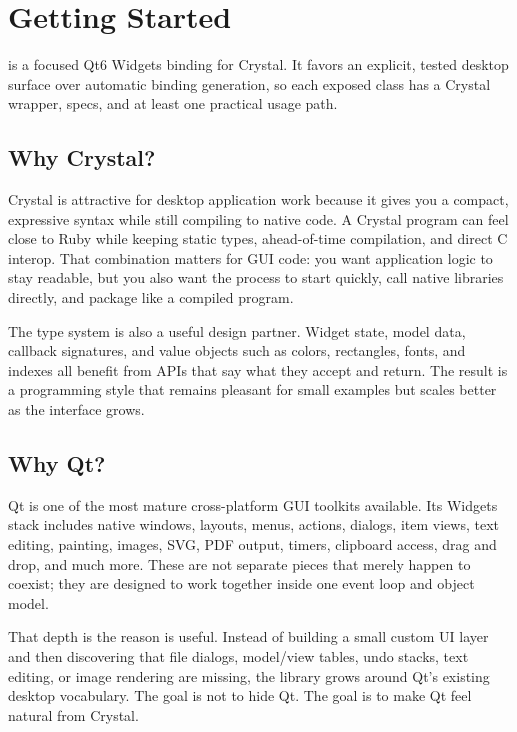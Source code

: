 \chapter{Getting Started}

 is a focused Qt6 Widgets binding for Crystal. It favors an explicit, tested desktop surface over automatic binding generation, so each exposed class has a Crystal wrapper, specs, and at least one practical usage path.

\section{Why Crystal?}

Crystal is attractive for desktop application work because it gives you a compact, expressive syntax while still compiling to native code. A Crystal program can feel close to Ruby while keeping static types, ahead-of-time compilation, and direct C interop. That combination matters for GUI code: you want application logic to stay readable, but you also want the process to start quickly, call native libraries directly, and package like a compiled program.

The type system is also a useful design partner. Widget state, model data, callback signatures, and value objects such as colors, rectangles, fonts, and indexes all benefit from APIs that say what they accept and return. The result is a programming style that remains pleasant for small examples but scales better as the interface grows.

\section{Why Qt?}

Qt is one of the most mature cross-platform GUI toolkits available. Its Widgets stack includes native windows, layouts, menus, actions, dialogs, item views, text editing, painting, images, SVG, PDF output, timers, clipboard access, drag and drop, and much more. These are not separate pieces that merely happen to coexist; they are designed to work together inside one event loop and object model.

That depth is the reason  is useful. Instead of building a small custom UI layer and then discovering that file dialogs, model/view tables, undo stacks, text editing, or image rendering are missing, the  library grows around Qt's existing desktop vocabulary. The goal is not to hide Qt. The goal is to make Qt feel natural from Crystal.

